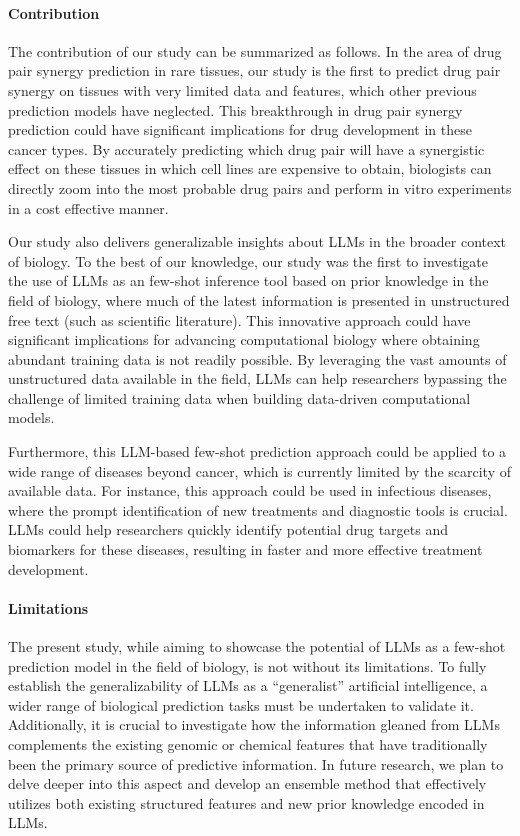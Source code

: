 \paragraph{Contribution}
The contribution of our study can be summarized as follows. In the area of drug pair synergy prediction in rare tissues, our study is the first to predict drug pair synergy on tissues with very limited data and features, which other previous prediction models have neglected. This breakthrough in drug pair synergy prediction could have significant implications for drug development in these cancer types. By accurately predicting which drug pair will have a synergistic effect on these tissues in which cell lines are expensive to obtain, biologists can directly zoom into the most probable drug pairs and perform in vitro experiments in a cost effective manner. 

Our study also delivers generalizable insights about LLMs in the broader context of  biology. To the best of our knowledge, our study was the first to investigate the use of LLMs as an few-shot inference tool based on prior knowledge in the field of biology, where much of the latest information is presented in unstructured free text (such as scientific literature). This innovative approach could have significant implications for advancing computational biology where obtaining abundant training data is not readily possible. By leveraging the vast amounts of unstructured data available in the field, LLMs can help researchers bypassing the challenge of limited training data when building data-driven computational models. 

Furthermore, this LLM-based few-shot prediction approach could be applied to a wide range of diseases beyond cancer, which is currently limited by the scarcity of available data. For instance, this approach could be used in infectious diseases, where the prompt identification of new treatments and diagnostic tools is crucial. LLMs could help researchers quickly identify potential drug targets and biomarkers for these diseases, resulting in faster and more effective treatment development. 

\paragraph{Limitations}
The present study, while aiming to showcase the potential of LLMs as a few-shot prediction model in the field of biology, is not without its limitations. To fully establish the generalizability of LLMs as a ``generalist'' artificial intelligence, a wider range of biological prediction tasks must be undertaken to validate it. Additionally, it is crucial to investigate how the information gleaned from LLMs complements the existing genomic or chemical features that have traditionally been the primary source of predictive information. In future research, we plan to delve deeper into this aspect and develop an ensemble method that effectively utilizes both existing structured features and new prior knowledge encoded in LLMs. 


